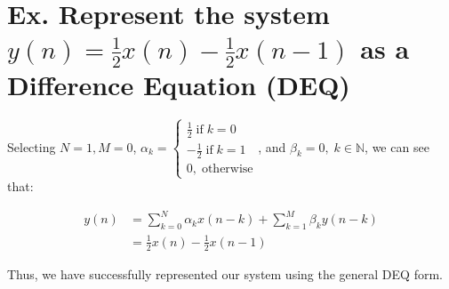 \documentclass{article}
\begin{document}
\section[Example ~\thesection]{Ex. Represent the system $y(n) = \frac{1}{2}x(n) - \frac{1}{2}x(n-1)$ as a Difference Equation (DEQ)}

Selecting $N = 1, M = 0$, $\alpha_k = \begin{cases} \frac{1}{2} \; \text{if} \; k = 0 \\ -\frac{1}{2} \; \text{if} \; k = 1 \\ 0, \; \text{otherwise} \end{cases}$, and $\beta_k = 0, \; k \in \mathbb{N}$, we can see that:

\begin{align*}
	y(n) &= \sum_{k=0}^{N}\alpha_{k}x(n-k) + \sum_{k=1}^M\beta_{k}y(n-k) \\
	&= \frac{1}{2}x(n) - \frac{1}{2}x(n-1)
\end{align*}

Thus, we have successfully represented our system using the general DEQ form.
\end{document}
